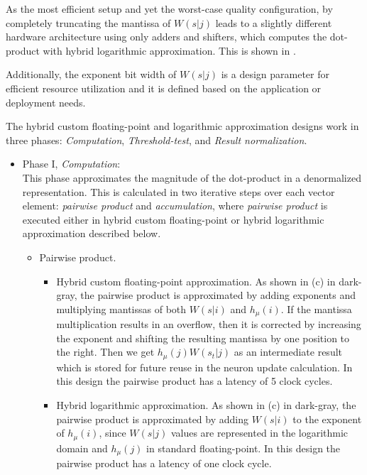  As the most efficient setup and yet the worst-case quality configuration, by completely truncating the mantissa of $W(s|j)$ leads to a slightly different hardware architecture using only adders and shifters, which computes the dot-product with hybrid logarithmic approximation. This is shown in .
 
Additionally, the exponent bit width of $W(s|j)$ is a design parameter for efficient resource utilization and it is defined based on the application or deployment needs.
 
 The hybrid custom floating-point and logarithmic approximation designs work in three phases: \emph{Computation}, \emph{Threshold-test}, and \emph{Result normalization}.
 
 \begin{itemize}
 	\item{Phase I, \emph{Computation}}: 
 	\\This phase approximates the magnitude of the dot-product in a denormalized representation. This is calculated in two iterative steps over each vector element: \emph{pairwise product} and \emph{accumulation}, where \emph{pairwise product} is executed either in hybrid custom floating-point or hybrid logarithmic approximation described below.
 	 \begin{itemize}[label={--}]
 	 	\item{Pairwise product}.
 	 	\begin{itemize} [label={--}]
	 		\item{Hybrid custom floating-point approximation}.
	 	 	As shown in (c) in dark-gray, the pairwise product is approximated by adding exponents and multiplying mantissas of both $W(s|i)$ and $h_\mu(i)$. If the mantissa multiplication results in an overflow, then it is corrected by increasing the  exponent and shifting the resulting mantissa by one position to the right. Then we get $h_\mu(j) W(s_t|j)$ as an intermediate result which is stored for future reuse in the neuron update calculation. In this design the pairwise product has a latency of 5 clock cycles.
	 	 	\item{Hybrid logarithmic approximation}.
	 	 	As shown in (c) in dark-gray, the pairwise product is approximated by adding $W(s|i)$ to the exponent of $h_\mu(i)$, since $W(s|j)$ values are represented in the logarithmic domain and $h_\mu(j)$ in standard floating-point. In this design the pairwise product has a latency of one clock cycle.
 	 	\end{itemize}

\end{itemize}
\end{itemize}
